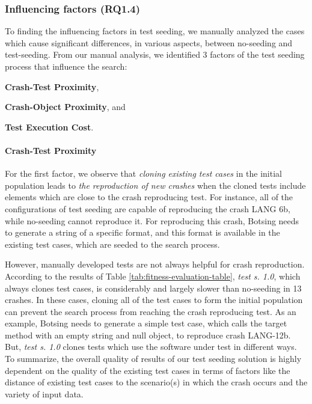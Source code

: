 \subsubsection{Influencing factors (\textbf{RQ1.4})}
\label{sec:eval:rq14}

To finding the influencing factors in test seeding, we manually analyzed the cases which cause significant differences, in various aspects, between no-seeding and test-seeding. From our manual analysis, we identified 3 factors of the test seeding process that influence the search:
%
\begin{inparaenum}[(i)]
\item \textbf{Crash-Test Proximity},
\item \textbf{Crash-Object Proximity}, and
\item \textbf{Test Execution Cost}.
\end{inparaenum}

\paragraph{Crash-Test Proximity} For the first factor, we observe that \emph{cloning existing test cases} in the initial population leads to \emph{the reproduction of new crashes} when the cloned tests include elements which are close to the crash reproducing test. For instance, all of the configurations of test seeding are capable of reproducing the crash LANG 6b, while no-seeding cannot reproduce it. For reproducing this crash, Botsing needs to generate a string of a specific format, and this format is available in the existing test cases, which are seeded to the search process.

However, manually developed tests are not always helpful for crash reproduction. According to the results of Table \ref{tab:fitness-evaluation-table}, \textit{test s. 1.0}, which always clones test cases, is considerably and largely slower than no-seeding in 13 crashes. In these cases, cloning all of the test cases to form the initial population can prevent the search process from reaching the crash reproducing test. As an example, Botsing needs to generate a simple test case, which calls the target method with an empty string and null object, to reproduce crash LANG-12b. But, \textit{test s. 1.0} clones tests which use the software under test in different ways.
To summarize, the overall quality of results of our test seeding solution is highly dependent on the quality of the existing test cases in terms of factors like the distance of existing test cases to the scenario(s) in which the crash occurs and the variety of input data.


